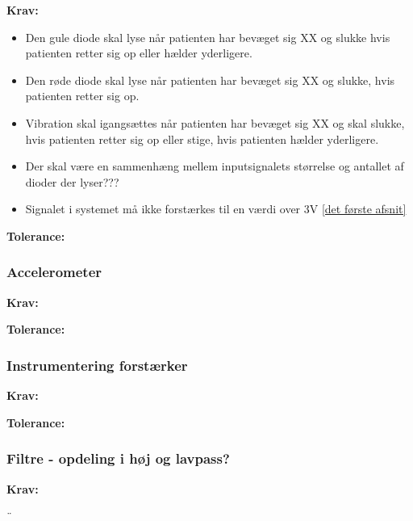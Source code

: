 \textbf{Krav:}
\begin{itemize}
\item Den gule diode skal lyse når patienten har bevæget sig XX og slukke hvis patienten retter sig op eller hælder yderligere.
\item Den røde diode skal lyse når patienten har bevæget sig XX og slukke, hvis patienten retter sig op.
\item Vibration skal igangsættes når patienten har bevæget sig XX og skal slukke, hvis patienten retter sig op eller stige, hvis patienten hælder yderligere.
\item Der skal være en sammenhæng mellem inputsignalets størrelse og antallet af dioder der lyser???
\item Signalet i systemet må ikke forstærkes til en værdi over 3V \ref{det første afsnit}
\end{itemize}

\textbf{Tolerance:}
\begin{itemize}
\end{itemize}

\subsubsection{Accelerometer}
\textbf{Krav:}
\begin{itemize}

\end{itemize}

\textbf{Tolerance:}
\begin{itemize}
\end{itemize}

\subsubsection{Instrumentering forstærker}
\textbf{Krav:}
\begin{itemize}

\end{itemize}

\textbf{Tolerance:}
\begin{itemize}
\end{itemize}

\subsubsection{Filtre - opdeling i høj og lavpass?}
\textbf{Krav:}
\begin{itemize}

\end{itemize}¨

